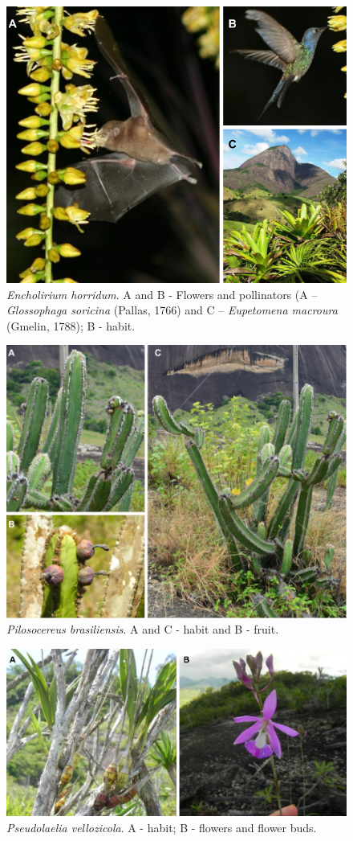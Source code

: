 \begin{figure}
 \centering
 \includegraphics[width=90 mm]{figs/encholirium.png} 
 \caption{\textit{Encholirium horridum}. A and B - Flowers and pollinators (A – \textit{Glossophaga soricina} (Pallas, 1766) and C – \textit{Eupetomena macroura} (Gmelin, 1788); B - habit.}
  \label{encholirium}
\end{figure}


\begin{figure}
 \centering
  \includegraphics[width=90 mm]{figs/pilosocereus.png} 
  \caption{\textit{Pilosocereus brasiliensis}. A and C - habit and B - fruit.}
  \label{pilosocereus}
\end{figure}

\begin{figure}
  \centering
  \includegraphics[width=90 mm]{figs/pseudo.png} 
  \caption{\textit{Pseudolaelia vellozicola}.  A - habit; B - flowers and flower buds.}
  \label{pseudo}
\end{figure}


